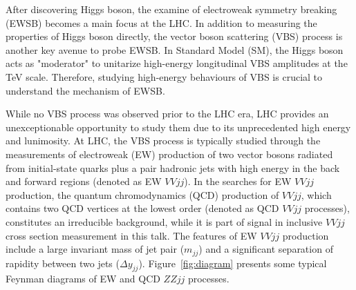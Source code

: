 After discovering Higgs boson\cite{HIGG-2012-27,CMS-HIG-12-028}, the examine of electroweak symmetry breaking (EWSB) becomes a main focus at the LHC.
In addition to measuring the properties of Higgs boson directly, the vector boson scattering (VBS) process is another key avenue to probe EWSB\cite{Lee:1977yc, Chanowitz:1985hj, Szleper:2014xxa}.
In Standard Model (SM), the Higgs boson acts as "moderator" to unitarize high-energy longitudinal VBS amplitudes at the TeV scale.
Therefore, studying high-energy behaviours of VBS is crucial to understand the mechanism of EWSB.

While no VBS process was observed prior to the LHC era, LHC provides an unexceptionable opportunity to study them due to its unprecedented high energy and lunimosity.
At LHC, the VBS process is typically studied through the measurements of electroweak (EW) production of two vector bosons radiated from initial-state quarks 
plus a pair hadronic jets with high energy in the back and forward regions (denoted as EW $VVjj$).
In the searches for EW $VVjj$ production, the quantum chromodynamics (QCD) production of $VVjj$, which contains two QCD vertices at the lowest order (denoted as QCD $VVjj$ processes), constitutes an irreducible background,
while it is part of signal in inclusive $VVjj$ cross section measurement in this talk.
The features of EW $VVjj$ production include a large invariant mass of jet pair ($m_{jj}$) and a significant separation of rapidity between two jets ($\Delta y_{jj}$).
Figure~\ref{fig:diagram} presents some typical Feynman diagrams of EW and QCD $ZZjj$ processes.
